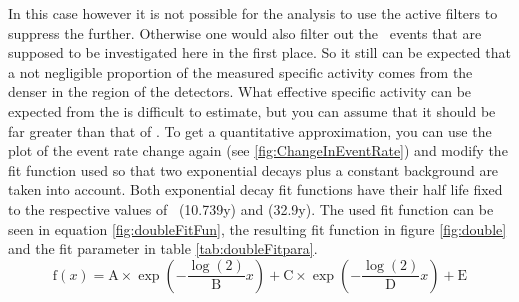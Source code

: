 \documentclass[encoding=utf8,british]{tumphthesis}
\begin{document}
In this case however it is not possible for the analysis to use the active filters to suppress the  further.
Otherwise one would also filter out the \Kr\ events that are supposed to be investigated here in the first place.
So it still can be expected that a not negligible proportion of the measured specific activity comes from the denser  in the region of the detectors.
What effective specific activity can be expected from the  is difficult to estimate, but you can assume that it should be far greater than that of \Kr.
To get a quantitative approximation, you can use the plot of the event rate change again (see \ref{fig:ChangeInEventRate}) and modify the fit function used so that two exponential decays plus a constant background are taken into account.
Both exponential decay fit functions have their half life fixed to the respective values of \Kr\ (10.739y) and  (32.9y).
The used fit function can be seen in equation \ref{fig:doubleFitFun}, the resulting fit function in figure \ref{fig:double} and the fit parameter in table \ref{tab:doubleFitpara}.
\begin{equation}
    \mathrm{f}(x) = \mathrm{A}\times\exp\left(-\frac{\log(2)}{\mathrm{B}} x \right) + \mathrm{C}\times\exp\left(-\frac{\log(2)}{\mathrm{D}} x \right) + \mathrm{E}
    \label{equ:doubleFitFun}
\end{equation}
\end{document}

